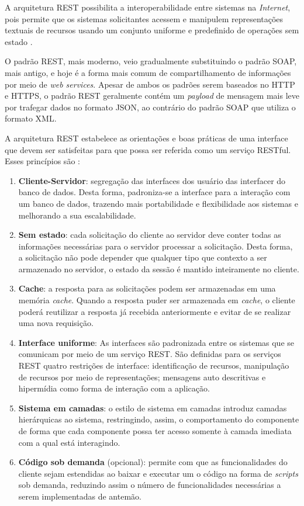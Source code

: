 A arquitetura REST possibilita a interoperabilidade entre sistemas na \textit{Internet}, pois permite que os sistemas solicitantes acessem e manipulem representações textuais de recursos usando um conjunto uniforme e predefinido de operações sem estado \cite{ferris2004webservices}.

O padrão REST, mais moderno, veio gradualmente substituindo o padrão SOAP, mais antigo, e hoje é a forma mais comum de compartilhamento de informações por meio de \textit{web services}. Apesar de ambos os padrões serem baseados no HTTP e HTTPS, o padrão REST geralmente contém um \textit{payload} de mensagem mais leve por trafegar dados no formato JSON, ao contrário do padrão SOAP que utiliza o formato XML.

A arquitetura REST estabelece as orientações e boas práticas de uma interface que devem ser satisfeitas  para que possa ser referida como um serviço RESTful. Esses princípios são \cite{fielding2000rest}:

\begin{enumerate}
	\item \textbf{Cliente-Servidor}:  segregação das interfaces dos usuário das interfacer do banco de dados. Desta forma, padroniza-se a interface para a interação com um banco de dados, trazendo mais portabilidade e flexibilidade aos sistemas e melhorando a sua escalabilidade.

	\item \textbf{Sem estado}: cada solicitação do cliente ao servidor deve conter todas as informações necessárias para o servidor processar a solicitação. Desta forma, a solicitação não pode depender que qualquer tipo que contexto a ser armazenado no servidor, o estado da sessão é mantido inteiramente no cliente.

	\item \textbf{Cache}:  a resposta para as solicitações podem ser armazenadas em uma memória \textit{cache}. Quando a resposta puder ser armazenada em \textit{cache}, o cliente poderá reutilizar a resposta já recebida anteriormente e evitar de se realizar uma nova requisição.

	\item \textbf{Interface uniforme}: As interfaces são padronizada entre os sistemas que se comunicam por meio de um serviço REST. São definidas para os serviços REST quatro restrições de interface: identificação de recursos, manipulação de recursos por meio de representações; mensagens auto descritivas e hipermídia como forma de interação com a aplicação.

	\item \textbf{Sistema em camadas}: o estilo de sistema em camadas introduz camadas hierárquicas  ao sistema, restringindo, assim, o comportamento do componente de forma que cada componente possa ter acesso somente à camada imediata com a qual está interagindo.

	\item \textbf{Código sob demanda} (opcional): permite com que as funcionalidades do cliente sejam estendidas ao baixar e executar um o código na forma de \textit{scripts} sob demanda, reduzindo assim o número de funcionalidades necessárias a serem implementadas de antemão.
\end{enumerate}

